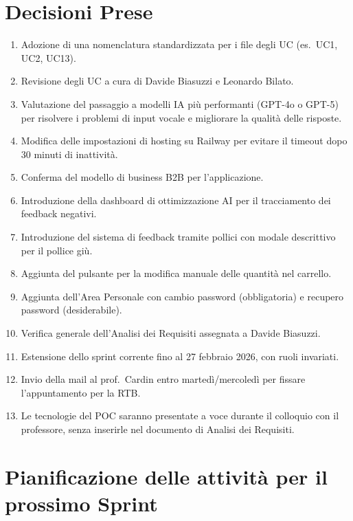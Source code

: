 \documentclass[a4paper, 11pt, oneside]{scrartcl}
\begin{document}
\newpage
\section{Decisioni Prese}
\begin{enumerate}
    \item Adozione di una nomenclatura standardizzata per i file degli UC (es.\ UC1, UC2, UC13).
    \item Revisione degli UC a cura di Davide Biasuzzi e Leonardo Bilato.
    \item Valutazione del passaggio a modelli IA più performanti (GPT-4o o GPT-5) per risolvere i problemi di input vocale e migliorare la qualità delle risposte.
    \item Modifica delle impostazioni di hosting su Railway per evitare il timeout dopo 30 minuti di inattività.
    \item Conferma del modello di business B2B per l'applicazione.
    \item Introduzione della dashboard di ottimizzazione AI per il tracciamento dei feedback negativi.
    \item Introduzione del sistema di feedback tramite pollici con modale descrittivo per il pollice giù.
    \item Aggiunta del pulsante per la modifica manuale delle quantità nel carrello.
    \item Aggiunta dell'Area Personale con cambio password (obbligatoria) e recupero password (desiderabile).
    \item Verifica generale dell'Analisi dei Requisiti assegnata a Davide Biasuzzi.
    \item Estensione dello sprint corrente fino al 27 febbraio 2026, con ruoli invariati.
    \item Invio della mail al prof.\ Cardin entro martedì/mercoledì per fissare l'appuntamento per la RTB.
    \item Le tecnologie del POC saranno presentate a voce durante il colloquio con il professore, senza inserirle nel documento di Analisi dei Requisiti.
\end{enumerate}

\newpage
\section{Pianificazione delle attività per il prossimo Sprint}
\end{document}
